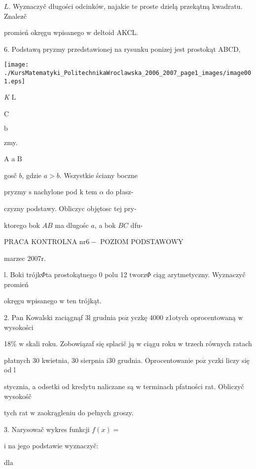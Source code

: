 \documentclass[a4paper,12pt]{article}
\begin{document}
$L$. Wyznaczyč długości odcinków, najakie te proste dzielą przekątną kwadratu. Znalez$\acute{}$č

promień okręgu wpisanego $\mathrm{w}$ deltoid AKCL.

6. Podstawą pryzmy przedstawionej na rysunku ponizej jest prostokąt ABCD,
\begin{center}
\texttt{[image: ./KursMatematyki\_PolitechnikaWroclawska\_2006\_2007\_page1\_images/image001.eps]}
\end{center}
{\it K} $\mathrm{L}$

C

$\mathrm{b}$

zmy.

A a $\mathrm{B}$

gosč $b$, gdzie $a>b$. Wszystkie ściany boczne

pryzmy $\mathrm{s}$ nachylone pod $\mathrm{k}$ tem $\alpha$ do płasz-

czyzny podstawy. Obliczyc objętosc tej pry-

ktorego bok $AB$ ma dlugośc $a$, a bok $BC$ dfu-





PRACA KONTROLNA $\mathrm{n}\mathrm{r}6-$ POZIOM PODSTAWOWY

marzec 2007r.

l. Boki trójk$\Phi$ta prostokątnego $0$ polu 12 $\mathrm{t}\mathrm{w}\mathrm{o}\mathrm{r}\mathrm{z}\Phi$ ciąg arytmetyczny. Wyznaczyč promień

okręgu wpisanego $\mathrm{w}$ ten trójkąt.

2. Pan Kowalski zaciągnąf 3l grudnia $\mathrm{p}\mathrm{o}\dot{\mathrm{z}}$ yczkę 4000 z1otych oprocentowaną $\mathrm{w}$ wysokości

18\% $\mathrm{w}$ skali roku. Zobowiązaf się splacič ją $\mathrm{w}$ ciągu roku $\mathrm{w}$ trzech równych ratach

płatnych 30 kwietnia, 30 sierpnia $\mathrm{i}30$ grudnia. Oprocentowanie $\mathrm{p}\mathrm{o}\dot{\mathrm{z}}$ yczki liczy się od l

stycznia, a odsetki od kredytu naliczane są $\mathrm{w}$ terminach pfatności rat. Obliczyč wysokośč

tych rat $\mathrm{w}$ zaokrągleniu do pełnych groszy.

3. Narysowač wykres funkcji $f(x)=$

$\mathrm{i}$ na jego podstawie wyznaczyč:

dla
\end{document}
